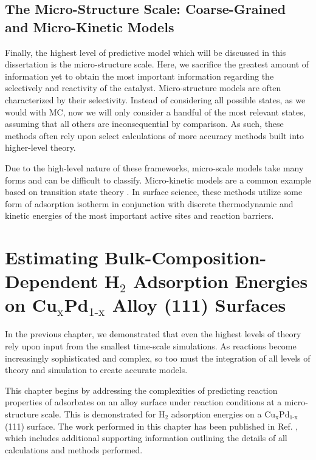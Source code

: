 \documentclass[12pt]{cmuthesis}
\begin{document}
\section{The Micro-Structure Scale: Coarse-Grained and Micro-Kinetic Models}
\label{sec:org2ac21fa}
Finally, the highest level of predictive model which will be discussed in this dissertation is the micro-structure scale. Here, we sacrifice the greatest amount of information yet to obtain the most important information regarding the selectively and reactivity of the catalyst. Micro-structure models are often characterized by their selectivity. Instead of considering all possible states, as we would with MC, now we will only consider a handful of the most relevant states, assuming that all others are inconsequential by comparison. As such, these methods often rely upon select calculations of more accuracy methods built into higher-level theory.

Due to the high-level nature of these frameworks, micro-scale models take many forms and can be difficult to classify. Micro-kinetic models are a common example \cite{carter-1961-kinet-model} based on transition state theory \cite{steinfeld-1989-chemic}. In surface science, these methods utilize some form of adsorption isotherm in conjunction with discrete thermodynamic and kinetic energies of the most important active sites and reaction barriers.

\chapter{Estimating Bulk-Composition-Dependent H\(_{\text{2}}\) Adsorption Energies on Cu\(_{\text{x}}\)Pd\(_{\text{1-x}}\) Alloy (111) Surfaces}
\label{sec:ch2}
In the previous chapter, we demonstrated that even the highest levels of theory rely upon input from the smallest time-scale simulations. As reactions become increasingly sophisticated and complex, so too must the integration of all levels of theory and simulation to create accurate models.

This chapter begins by addressing the complexities of predicting reaction properties of adsorbates on an alloy surface under reaction conditions at a micro-structure scale. This is demonstrated for H\(_{\text{2}}\) adsorption energies on a Cu\(_{\text{x}}\)Pd\(_{\text{1-x}}\) (111) surface. The work performed in this chapter has been published in Ref. , which includes additional supporting information outlining the details of all calculations and methods performed.
\end{document}
